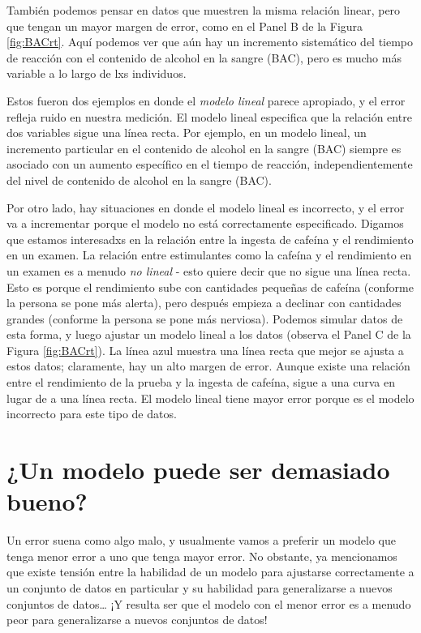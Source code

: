 \documentclass[
  12pt,
]{book}
\begin{document}
También podemos pensar en datos que muestren la misma relación linear, pero que tengan un mayor margen de error, como en el Panel B de la Figura \ref{fig:BACrt}. Aquí podemos ver que aún hay un incremento sistemático del tiempo de reacción con el contenido de alcohol en la sangre (BAC), pero es mucho más variable a lo largo de lxs individuos.

Estos fueron dos ejemplos en donde el \emph{modelo lineal} parece apropiado, y el error refleja ruido en nuestra medición. El modelo lineal especifica que la relación entre dos variables sigue una línea recta. Por ejemplo, en un modelo lineal, un incremento particular en el contenido de alcohol en la sangre (BAC) siempre es asociado con un aumento específico en el tiempo de reacción, independientemente del nivel de contenido de alcohol en la sangre (BAC).

Por otro lado, hay situaciones en donde el modelo lineal es incorrecto, y el error va a incrementar porque el modelo no está correctamente especificado. Digamos que estamos interesadxs en la relación entre la ingesta de cafeína y el rendimiento en un examen. La relación entre estimulantes como la cafeína y el rendimiento en un examen es a menudo \emph{no lineal} - esto quiere decir que no sigue una línea recta. Esto es porque el rendimiento sube con cantidades pequeñas de cafeína (conforme la persona se pone más alerta), pero después empieza a declinar con cantidades grandes (conforme la persona se pone más nerviosa). Podemos simular datos de esta forma, y luego ajustar un modelo lineal a los datos (observa el Panel C de la Figura \ref{fig:BACrt}). La línea azul muestra una línea recta que mejor se ajusta a estos datos; claramente, hay un alto margen de error. Aunque existe una relación entre el rendimiento de la prueba y la ingesta de cafeína, sigue a una curva en lugar de a una línea recta. El modelo lineal tiene mayor error porque es el modelo incorrecto para este tipo de datos.

\hypertarget{overfitting}{%
\section{¿Un modelo puede ser demasiado bueno?}\label{overfitting}}

Un error suena como algo malo, y usualmente vamos a preferir un modelo que tenga menor error a uno que tenga mayor error. No obstante, ya mencionamos que existe tensión entre la habilidad de un modelo para ajustarse correctamente a un conjunto de datos en particular y su habilidad para generalizarse a nuevos conjuntos de datos\ldots{} ¡Y resulta ser que el modelo con el menor error es a menudo peor para generalizarse a nuevos conjuntos de datos!
\end{document}
